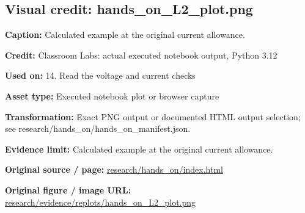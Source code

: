 \documentclass[10pt,letterpaper]{article}
\begin{document}
\subsection*{Visual credit: hands\_on\_L2\_plot.png}
\textbf{Caption:} Calculated example at the original current allowance.\par
\textbf{Credit:} Classroom Labs: actual executed notebook output, Python 3.12\par
\textbf{Used on:} 14. Read the voltage and current checks\par
\textbf{Asset type:} Executed notebook plot or browser capture\par
\textbf{Transformation:} Exact PNG output or documented HTML output selection; see research/hands\_on/hands\_on\_manifest.json.\par
\textbf{Evidence limit:} Calculated example at the original current allowance.\par
\textbf{Original source / page:} \href{../research/hands_on/index.html}{\small\ttfamily research/\allowbreak{}hands\_\allowbreak{}on/\allowbreak{}index.\allowbreak{}html}\par
\textbf{Original figure / image URL:} \href{../research/evidence/replots/hands_on_L2_plot.png}{\small\ttfamily research/\allowbreak{}evidence/\allowbreak{}replots/\allowbreak{}hands\_\allowbreak{}on\_\allowbreak{}L2\_\allowbreak{}plot.\allowbreak{}png}\par
\par\medskip
\end{document}
